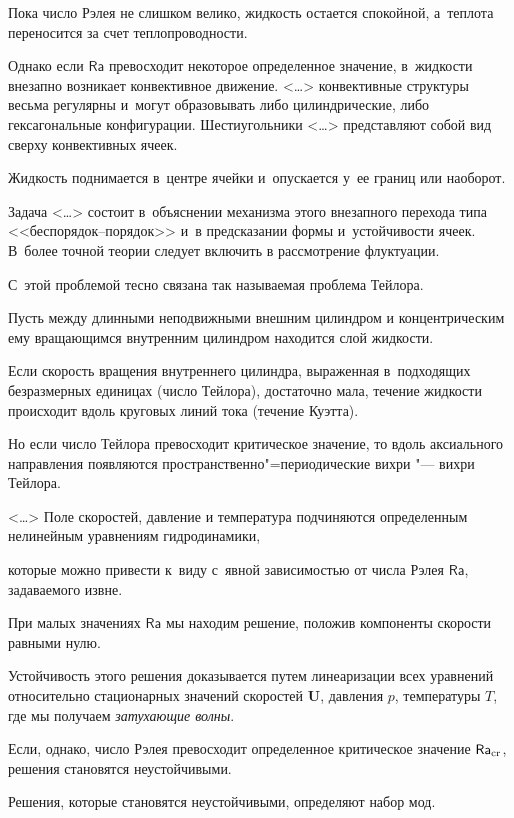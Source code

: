 Пока число Рэлея не слишком велико, жидкость остается спокойной, а~теплота переносится за счет теплопроводности. 

Однако если $\mathsf{Ra}$ превосходит некоторое определенное значение, в~жидкости внезапно возникает конвективное движение. <\dots> конвективные структуры весьма регулярны и~могут образовывать либо цилиндрические, либо гексагональные конфигурации. Шестиугольники <\dots> представляют собой вид сверху конвективных ячеек. 

Жидкость поднимается в~центре ячейки и~опускается у~ее границ или наоборот. 

Задача <\dots> состоит в~объяснении механизма этого внезапного перехода типа <<беспорядок--порядок>> и~в предсказании формы и~устойчивости ячеек. В~более точной теории следует включить в рассмотрение флуктуации.



С~этой проблемой тесно связана так называемая проблема Тейлора.

Пусть между длинными неподвижными внешним цилиндром и концентрическим ему вращающимся внутренним цилиндром находится слой жидкости. 

Если скорость вращения внутреннего цилиндра, выраженная в~подходящих безразмерных единицах (число Тейлора), достаточно мала, течение жидкости происходит вдоль круговых линий тока (течение Куэтта). 

Но если число Тейлора превосходит критическое значение, то вдоль аксиального направления появляются пространственно"=периодические вихри "--- вихри Тейлора. 



<\dots> Поле скоростей, давление и температура подчиняются определенным нелинейным уравнениям гидродинамики, 

которые можно привести к~виду с~явной зависимостью от числа Рэлея $\mathsf{Ra}$, задаваемого извне. 

При малых значениях $\mathsf{Ra}$ мы находим решение, положив компоненты скорости равными нулю. 

Устойчивость этого решения доказывается путем линеаризации всех уравнений относительно стационарных значений скоростей $\boldsymbol U$, давления $p$, температуры $T$, где мы получаем {\it затухающие волны}. 

Если, однако, число Рэлея  превосходит определенное критическое значение $\mathsf{Ra}_{\rm cr}$, решения становятся неустойчивыми. 

Решения, которые становятся неустойчивыми, определяют набор мод. 


